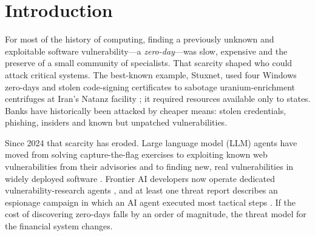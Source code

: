 \documentclass[11pt,a4paper]{article}
\begin{document}
\vspace{4pt}
\noindent{}

\newpage
\tableofcontents
\newpage

\section{Introduction}\label{sec:intro}

For most of the history of computing, finding a previously unknown and exploitable software vulnerability---a \emph{zero-day}---was slow, expensive and the preserve of a small community of specialists. That scarcity shaped who could attack critical systems. The best-known example, Stuxnet, used four Windows zero-days and stolen code-signing certificates to sabotage uranium-enrichment centrifuges at Iran's Natanz facility \citep{falliere2011stuxnet,langner2013kill,zetter2014countdown}; it required resources available only to states. Banks have historically been attacked by cheaper means: stolen credentials, phishing, insiders and known but unpatched vulnerabilities.

Since 2024 that scarcity has eroded. Large language model (LLM) agents have moved from solving capture-the-flag exercises \citep{zhang2024cybench} to exploiting known web vulnerabilities from their advisories \citep{fang2024oneday,zhu2024teams} and to finding new, real vulnerabilities in widely deployed software \citep{bigsleep2024,darpa2025aixcc}. Frontier AI developers now operate dedicated vulnerability-research agents \citep{openai2025aardvark,deepmind2025codemender,anthropic2026glasswing}, and at least one threat report describes an espionage campaign in which an AI agent executed most tactical steps \citep{anthropic2025espionage}. If the cost of discovering zero-days falls by an order of magnitude, the threat model for the financial system changes.
\end{document}
